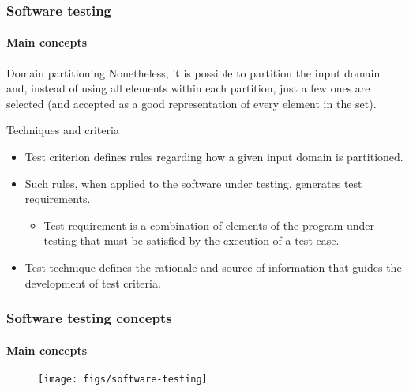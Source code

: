 \begin{frame}
\frametitle{Software testing}
\framesubtitle{Main concepts}

\begin{block:principle}{Domain partitioning}
Nonetheless, it is possible to partition the input domain and, instead of
using all elements within each partition, just a few ones are selected (and
accepted as a good representation of every element in the set).
\end{block:principle}

\begin{block:fact}{Techniques and criteria}
\begin{itemize}
	\item Test criterion defines rules regarding how a given input domain is
	partitioned.

	\item Such rules, when applied to the software under testing, generates
	test requirements.
	\begin{itemize}
		\item Test requirement is a combination of elements of the program
		under testing that must be satisfied by the execution of a test case.
	\end{itemize}

	\item Test technique defines the rationale and source of information that
	guides the development of test criteria.
\end{itemize}
\end{block:fact}
\end{frame}



\begin{frame}[c, hasprev=true, hasnext=false]
\frametitle{Software testing concepts}
\framesubtitle{Main concepts}

\begin{figure}
    \centering
    \texttt{[image: figs/software-testing]}
\end{figure}
\end{frame}
